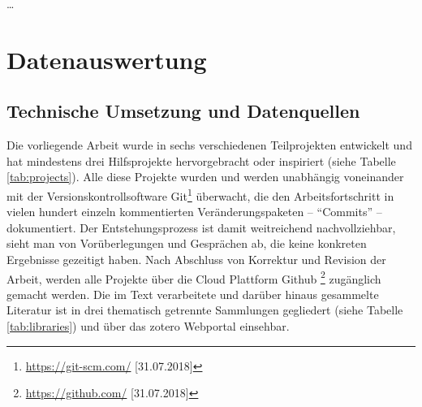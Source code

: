 \documentclass[openany,twoside,twocolumn]{book}
\let\rmarkdownfootnote\footnote%
\def\footnote{\protect\rmarkdownfootnote}
\let\pby\printbibliography
\renewcommand{\printbibliography}{}
\begin{document}
\ldots{}

\pby[title={Literatur},segment=\therefsegment,heading=subbibintoc]

\hypertarget{datenauswertung}{%
\chapter{Datenauswertung}\label{datenauswertung}}

\hypertarget{technische-umsetzung-und-datenquellen}{%
\section{Technische Umsetzung und
Datenquellen}\label{technische-umsetzung-und-datenquellen}}

Die vorliegende Arbeit wurde in sechs verschiedenen Teilprojekten
entwickelt und hat mindestens drei Hilfsprojekte hervorgebracht oder
inspiriert (siehe Tabelle \ref{tab:projects}). Alle diese Projekte
wurden und werden unabhängig voneinander mit der
Versionskontrollsoftware Git\footnote{\url{https://git-scm.com/}
  {[}31.07.2018{]}} überwacht, die den Arbeitsfortschritt in vielen
hundert einzeln kommentierten Veränderungspaketen -- ``Commits'' --
dokumentiert. Der Entstehungsprozess ist damit weitreichend
nachvollziehbar, sieht man von Vorüberlegungen und Gesprächen ab, die
keine konkreten Ergebnisse gezeitigt haben. Nach Abschluss von Korrektur
und Revision der Arbeit, werden alle Projekte über die Cloud Plattform
Github \footnote{\url{https://github.com/} {[}31.07.2018{]}} zugänglich
gemacht werden. Die im Text verarbeitete und darüber hinaus gesammelte
Literatur ist in drei thematisch getrennte Sammlungen gegliedert (siehe
Tabelle \ref{tab:libraries}) und über das zotero Webportal einsehbar.
\end{document}
